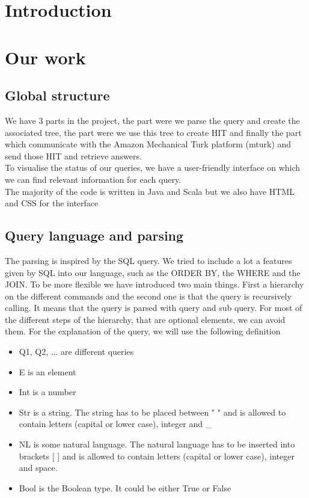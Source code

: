 \documentclass{article}
\begin{document}


\tableofcontents
\newpage


\section{Introduction}



\section{Our work} %
\subsection{Global structure}
We have 3 parts in the project, the part were we parse the query and create the associated tree, the part were we use this tree to create HIT and finally the part which communicate with the Amazon Mechanical Turk platform (mturk) and send those HIT and retrieve answers.\\
To visualise the status of our queries, we have a user-friendly interface on which we can find relevant information for each query.\\ The majority of the code is written in Java and Scala but we also have HTML and CSS for the interface
\subsection{Query language and parsing}
The parsing is inspired by the SQL query. We tried to include a lot a features given by SQL into our language, such as the ORDER BY, the WHERE and the JOIN. To be more flexible we have introduced two main things. First a hierarchy on the different commands and the second one is that the query is recursively calling. It means that the query is parsed with query and sub query.
For most of the different steps of the hierarchy, that are optional elements, we can avoid them.
For the explanation of the query, we will use the following definition
\begin{itemize}
\item Q1, Q2, ... are different queries
\item E is an element
\item Int is a number
\item Str is a string. The string has to be placed between " " and is allowed to contain letters (capital or lower case), integer and \_
\item NL is some natural language. The natural language has to be inserted into brackets [ ] and is allowed to contain letters (capital or lower case), integer and space.
\item Bool is the Boolean type. It could be either True or False
\end{itemize}
\end{document}
